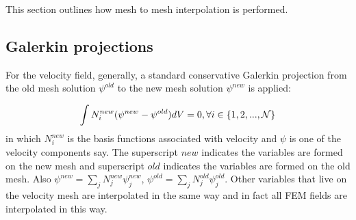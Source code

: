 This section outlines how mesh to mesh interpolation is performed. 


\subsection{Galerkin projections}
\label{Galerkin projections}
For the velocity field, generally, a standard conservative Galerkin projection 
from the old mesh solution $\psi^{old}$ to the new mesh solution $\psi^{new}$ is applied:

\begin{equation}
\int N_i^{new} ( \psi^{new} -\psi^{old} ) dV=0, \forall i \in\{1,2,...,\cal{N} \}
\label{Vel-interpolation}
\end{equation}
in which $N_i^{new}$ is the basis functions associated with velocity and $\psi$ is one 
of the velocity components say. The superscript $new$ indicates the variables are formed on the new mesh and 
superscript $old$ indicates the variables are formed on the old mesh. 
Also $\psi^{new}=\sum_j N_j^{new} \psi_j^{new}$,  $\psi^{old}=\sum_j N_j^{old} \psi_j^{old}$. Other variables that live on the velocity mesh are interpolated 
in the same way and in fact all FEM fields are interpolated in this way. 

